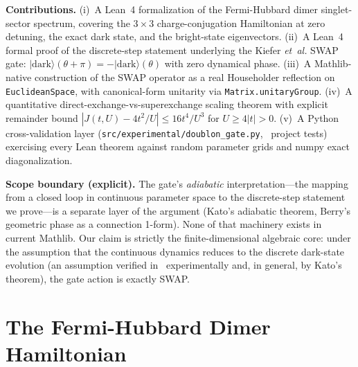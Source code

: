 \documentclass[aps,prd,twocolumn,showpacs,superscriptaddress,nofootinbib]{revtex4-2}
\newcommand{\darkstate}{|\text{dark}\rangle}
\begin{document}
\textbf{Contributions.} (i)~A Lean~4 formalization of the
Fermi-Hubbard dimer singlet-sector spectrum, covering the $3\times 3$
charge-conjugation Hamiltonian at zero detuning, the exact dark state,
and the bright-state eigenvectors. (ii)~A Lean~4 formal proof of the
discrete-step statement underlying the Kiefer \textit{et~al.} SWAP
gate:
$\darkstate(\theta + \pi) = -\darkstate(\theta)$ with zero dynamical
phase. (iii)~A Mathlib-native construction of the SWAP operator as a
real Householder reflection on \texttt{EuclideanSpace}, with
canonical-form unitarity via \texttt{Matrix.unitaryGroup}. (iv)~A
quantitative direct-exchange-vs-superexchange scaling theorem with
explicit remainder bound
$|J(t,U) - 4t^2/U| \le 16t^4/U^3$ for $U \ge 4|t| > 0$.
(v)~A Python cross-validation layer (\texttt{src/experimental/doublon\_gate.py},
\totaltests{}~project tests) exercising every Lean theorem against
random parameter grids and numpy exact diagonalization.

\textbf{Scope boundary (explicit).} The gate's \emph{adiabatic}
interpretation---the mapping from a closed loop in continuous
parameter space to the discrete-step statement we prove---is a
separate layer of the argument (Kato's adiabatic theorem, Berry's
geometric phase as a connection 1-form). None of that machinery
exists in current Mathlib. Our claim is strictly the finite-dimensional
algebraic core: under the assumption that the continuous dynamics
reduces to the discrete dark-state evolution (an assumption verified
in~\cite{Kiefer2026} experimentally and, in general, by Kato's
theorem), the gate action is exactly SWAP.

\section{The Fermi-Hubbard Dimer Hamiltonian}
\label{sec:hamiltonian}
\end{document}
